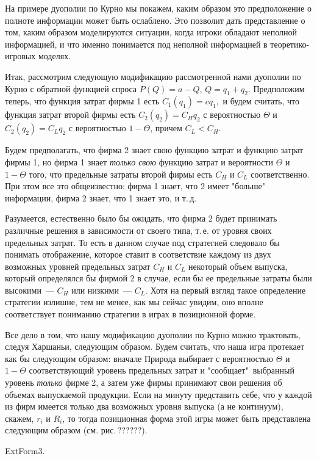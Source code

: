 На примере дуополии по Курно мы покажем, каким образом это предположение
о полноте информации может быть ослаблено. Это позволит дать представление о том, каким
образом моделируются ситуации, когда игроки обладают неполной информацией,
и что именно понимается под неполной информацией в теоретико-игровых моделях.

Итак, рассмотрим следующую модификацию рассмотренной нами дуополии по Курно
с обратной функцией спроса $P(Q)=a-Q$, $Q=q_1+q_2$.  Предположим
теперь, что функция затрат фирмы 1 есть $C_1(q_1)=cq_1,$ и будем
считать, что функция затрат второй фирмы есть $C_2(q_2)=C_Hq_2$ с
вероятностью $\Theta$ и $C_2(q_2)=C_Lq_2$ с вероятностью  $1-\Theta$,
причем $C_L<C_H$.

Будем предполагать, что фирма 2 знает свою функцию затрат и функцию
затрат фирмы 1, но фирма 1 знает \emph{только
свою} функцию затрат и вероятности $\Theta$  и $1-\Theta$
того, что предельные затраты второй фирмы есть $C_H$  и $C_L$
соответственно.  При этом все это  общеизвестно: фирма 1 знает, что 2
имеет "больше"\, информации, фирма 2 знает, что 1 знает это,
и т.\,д.

Разумеется, естественно было бы ожидать, что фирма 2 будет принимать
различные решения в зависимости от своего типа, т.\,е. от уровня
своих предельных затрат.  То есть в данном случае под стратегией
следовало бы понимать отображение, которое ставит в соответствие каждому
из двух возможных уровней предельных затрат $C_H$ и $C_L$ некоторый
объем выпуска, который определялся бы фирмой 2 в случае, если бы ее
предельные затраты были высокими~--- $C_H$ или низкими~--- $C_L$.
Хотя на первый взгляд такое определение стратегии излишне, тем не менее,
как мы сейчас увидим, оно вполне соответствует пониманию стратегии в
играх в позиционной форме.

Все дело в том, что нашу модификацию дуополии по Курно можно трактовать,
следуя Харшаньи, следующим образом. Будем считать, что наша игра
протекает как бы следующим образом:
вначале Природа выбирает с вероятностью $\Theta$ и $1-\Theta$
соответствующий уровень предельных затрат и "сообщает"\, выбранный
уровень \emph{только} фирме 2, а затем уже фирмы принимают свои
решения об объемах выпускаемой продукции. Если на минуту представить
себе, что у каждой из фирм имеется только два возможных уровня выпуска
(а не континуум), скажем, $r_i$ и $R_i$, то тогда позиционная форма этой
игры может быть представлена следующим образом (см. рис.\,??????).


ExtForm3.


